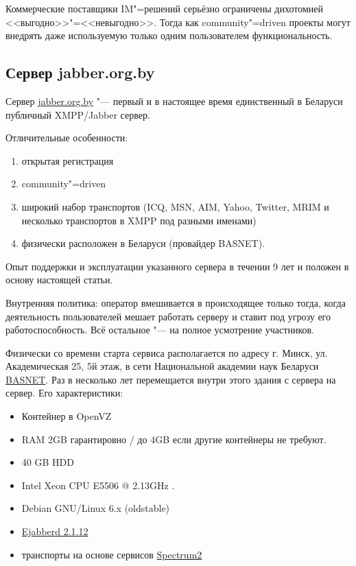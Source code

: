 \documentclass[10pt, a5paper]{article}
\begin{document}
Коммерческие поставщики IM"=решений серьёзно ограничены дихотомией <<выгодно>>"=<<невыгодно>>. Тогда как community"=driven проекты могут внедрять даже используемую только одним пользователем функциональность.

\subsection*{Сервер jabber.org.by}

Сервер \href{http://jabber.org.by}{jabber.org.by} "--- первый и в настоящее время единственный в Беларуси публичный XMPP/Jabber сервер.

Отличительные особенности:

\begin{enumerate}
  \item открытая регистрация
  \item community"=driven
  \item широкий набор транспортов (ICQ, MSN, AIM, Yahoo, Twitter, MRIM и несколько транспортов в XMPP под разными именами)
  \item физически расположен в Беларуси (провайдер BASNET).
\end{enumerate}

Опыт поддержки и эксплуатации указанного сервера в течении 9 лет и положен в основу  настоящей статьи.

Внутренняя политика: оператор вмешивается в происходящее только тогда, когда деятельность пользователей мешает работать серверу и ставит под угрозу его работоспособность. Всё остальное "--- на полное усмотрение участников.

Физически со времени старта сервиса располагается по адресу г. Минск, ул. Академическая 25, 5й этаж, в сети Национальной академии наук Беларуси \href{http://basnet.by}{BASNET}. Раз в несколько лет перемещается внутри этого здания с сервера на сервер. Его характеристики:

\begin{itemize}
  \item Контейнер в OpenVZ
  \item RAM 2GB гарантировно /  до 4GB если другие контейнеры не требуют.
  \item 40 GB HDD
  \item Intel\textregistered{} Xeon\textregistered{} CPU E5506  @ 2.13GHz . 
  \item Debian GNU/Linux 6.x (oldstable)
  \item \href{http://www.process"=one.net/en/ejabberd}{Ejabberd 2.1.12}
  \item транспорты на основе сервисов \href{http://spectrum.im}{Spectrum2}
\end{itemize}
\end{document}
